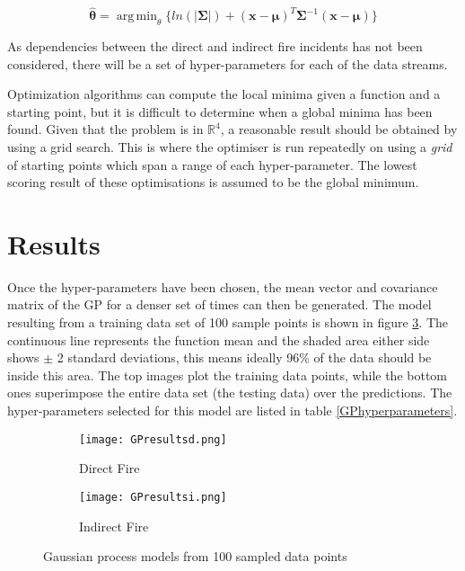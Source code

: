 \documentclass[a4paper,11pt]{report}
\DeclareMathOperator*{\argmin}{arg\,min}
\begin{document}
\begin{equation} \label{eq:GPfmin}
\hat{\boldsymbol{\theta}} = \argmin_\theta{\{ln(|\boldsymbol{\Sigma}|) +(\mathbf{x}-\boldsymbol{\mu})^{T}\boldsymbol{\Sigma}^{-1}(\mathbf{x}-\boldsymbol{\mu})}\}
\end{equation}

\doublespacing

As dependencies between the direct and indirect fire incidents has not been considered, there will be a set of hyper-parameters for each of the data streams. \par

Optimization algorithms can compute the local minima given a function and a starting point, but it is difficult to determine when a global minima has been found. Given that the problem is in \(\mathds{R}^4\), a reasonable result should be obtained by using a grid search. This is where the optimiser is run repeatedly on using a \textit{grid} of starting points which span a range of each hyper-parameter. The lowest scoring result of these optimisations is assumed to be the global minimum. \par

\section{Results}

Once the hyper-parameters have been chosen, the mean vector and covariance matrix of the GP for a denser set of times can then be generated. The model resulting from a training data set of 100 sample points is shown in figure \ref{fig:GPresults}. The continuous line represents the function mean and the shaded area either side shows \(\pm\) 2 standard deviations, this means ideally 96\% of the data should be inside this area. The top images plot the training data points, while the bottom ones superimpose the entire data set (the testing data) over the predictions. The hyper-parameters selected for this model are listed in table \ref{GPhyperparameters}.

\begin{figure}
\centering
\begin{subfigure}{.5\textwidth}
	\centering
	\texttt{[image: GPresultsd.png]}
  	\caption{Direct Fire}
  	\label{fig:sub1}
\end{subfigure}%
\begin{subfigure}{.5\textwidth}
  	\centering
  	\texttt{[image: GPresultsi.png]}
  	\caption{Indirect Fire}
 	 \label{fig:sub2}
\end{subfigure}
\caption{Gaussian process models from 100 sampled data points}
\label{fig:GPresults}
\end{figure}
\end{document}
